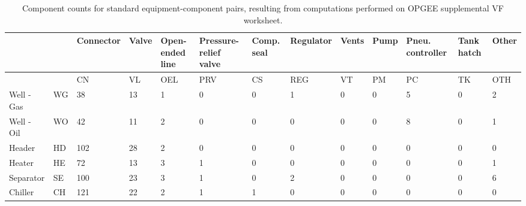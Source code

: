\documentclass[11pt]{report}
\begin{document}
\begin{landscape}
\begin{table}[]
\begin{scriptsize}
\caption{Component counts for standard equipment-component pairs, resulting from computations performed on OPGEE supplemental VF worksheet.}
\label{tab:Std_Equipment_Component}
\begin{tabular*}{1\columnwidth}{p{}p{} | p{}p{}p{}p{}p{}p{}p{}p{}p{}p{}p{}}
\toprule
			&   &	Connector              & Valve & Open-ended line & Pressure-relief valve & Comp. seal & Regulator & Vents & Pump & Pneu. controller & Tank hatch & Other      \\
			\midrule
                       &       & CN              & VL                    & OEL             & PRV       & CS    & REG  & VT                            & PM              & PC                  & TK & OTH \\
                       \midrule
Well - Gas             & WG    & 38              & 13                    & 1               & 0         & 0     & 1    & 0                             & 0               & 5                   & 0  & 2   \\
Well - Oil             & WO    & 42              & 11                    & 2               & 0         & 0     & 0    & 0                             & 0               & 8                   & 0  & 1   \\
Header                 & HD    & 102             & 28                    & 2               & 0         & 0     & 0    & 0                             & 0               & 0                   & 0  & 0   \\
Heater                 & HE    & 72              & 13                    & 3               & 1         & 0     & 0    & 0                             & 0               & 0                   & 0  & 1   \\
Separator              & SE    & 100             & 23                    & 3               & 1         & 0     & 2    & 0                             & 0               & 0                   & 0  & 6   \\
Chiller                & CH    & 121             & 22                    & 2               & 1         & 1     & 0    & 0                             & 0               & 0                   & 0  & 0   \\

\end{tabular*}
\end{scriptsize}
\end{table}
\end{landscape}
\end{document}
